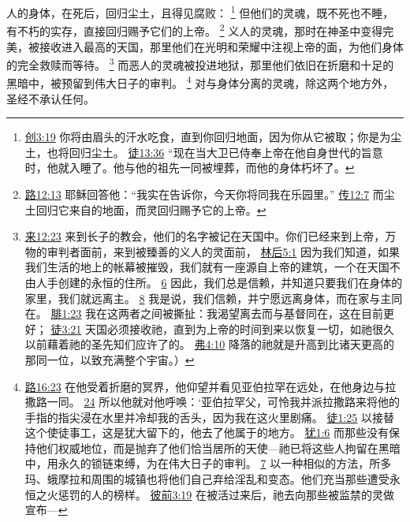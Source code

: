 \documentclass[12pt, a4paper, oneside]{ctexart}
\newcounter{parnum}[section]
\newcommand{\N}{%
   \noindent\refstepcounter{parnum}%
    \makebox[\parindent][l]{\textbf{\arabic{parnum}.}}}
\begin{document}
\N 人的身体，在死后，回归尘土，且得见腐败：
	\footnote {
		\href{https://biblehub.com/genesis/3-19.htm}{创3:19} 你将由眉头的汗水吃食，直到你回归地面，因为你从它被取；你是为尘土，也将回归尘土。
		\href{https://biblehub.com/acts/13-36.htm}{徒13:36} “现在当大卫已侍奉上帝在他自身世代的旨意时，他就入睡了。他与他的祖先一同被埋葬，而他的身体朽坏了。
	}
	但他们的灵魂，既不死也不睡，有不朽的实存，直接回归赐予它们的上帝。
	\footnote {
		\href{https://biblehub.com/luke/23-43.htm}{路12:13} 耶稣回答他：“我实在告诉你，今天你将同我在乐园里。”
		\href{https://biblehub.com/ecclesiastes/12-7.htm}{传12:7} 而尘土回归它来自的地面，而灵回归赐予它的上帝。
	}
	义人的灵魂，那时在神圣中变得完美，被接收进入最高的天国，那里他们在光明和荣耀中注视上帝的面，为他们身体的完全救赎而等待。
	\footnote {
		\href{https://biblehub.com/hebrews/12-23.htm}{来12:23} 来到长子的教会，他们的名字被记在天国中。你们已经来到上帝，万物的审判者面前，来到被臻善的义人的灵面前，
		\href{https://biblehub.com/2_corinthians/5-1.htm}{林后5:1} 因为我们知道，如果我们生活的地上的帐幕被摧毁，我们就有一座源自上帝的建筑，一个在天国不由人手创建的永恒的住所。
		\href{https://biblehub.com/2_corinthians/5-6.htm}{6} 因此，我们总是信赖，并知道只要我们在身体的家里，我们就远离主。
		\href{https://biblehub.com/2_corinthians/5-8.htm}{8} 我是说，我们信赖，并宁愿远离身体，而在家与主同在。
		\href{https://biblehub.com/philippians/1-23.htm}{腓1:23} 我在这两者之间被撕扯：我渴望离去而与基督同在，这在目前更好；
		\href{https://biblehub.com/acts/3-21.htm}{徒3:21} 天国必须接收祂，直到为上帝的时间到来以恢复一切，如祂很久以前藉着祂的圣先知们应许了的。
		\href{https://biblehub.com/ephesians/4-10.htm}{弗4:10} 降落的祂就是升高到比诸天更高的那同一位，以致充满整个宇宙。）
	}
	而恶人的灵魂被投进地狱，那里他们依旧在折磨和十足的黑暗中，被预留到伟大日子的审判。
	\footnote {
		\href{https://biblehub.com/luke/16-23.htm}{路16:23} 在他受着折磨的冥界，他仰望并看见亚伯拉罕在远处，在他身边与拉撒路一同。
		\href{https://biblehub.com/luke/16-24.htm}{24} 所以他就对他呼唤：‘亚伯拉罕父，可怜我并派拉撒路来将他的手指的指尖浸在水里并冷却我的舌头，因为我在这火里剧痛。
		\href{https://biblehub.com/acts/1-25.htm}{徒1:25} 以接替这个使徒事工，这是犹大留下的，他去了他属于的地方。
		\href{https://biblehub.com/jude/1-6.htm}{犹1:6} 而那些没有保持他们权威地位，而是抛弃了他们恰当居所的天使---祂已将这些人拘留在黑暗中，用永久的锁链束缚，为在伟大日子的审判。
		\href{https://biblehub.com/jude/1-7.htm}{7} 以一种相似的方法，所多玛、蛾摩拉和周围的城镇也将他们自己弃给淫乱和变态。他们充当那些遭受永恒之火惩罚的人的榜样。
		\href{https://biblehub.com/1_peter/3-19.htm}{彼前3:19} 在被活过来后，祂去向那些被监禁的灵做宣布---
	}
	对与身体分离的灵魂，除这两个地方外，圣经不承认任何。
	
\end{document}
